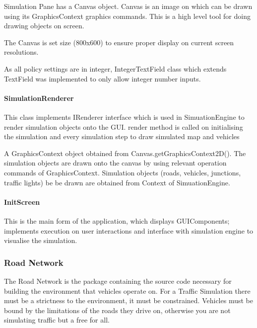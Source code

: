 \documentclass[11pt]{article}
\begin{document}
{\begin{itemize}
    Simulation Pane has a Canvas object. Canvas is an image  on which can be drawn using its GraphicsContext graphics commands. This is a high level tool for doing drawing objects on screen. 
        
    The Canvas is set size (800x600) to ensure proper display on current screen resolutions. 
    
    
    
    As all policy settings are in integer, IntegerTextField  class which extends TextField was implemented to only allow integer number inputs.
    
    
    
    \paragraph{SimulationRenderer}
    
    This class implements IRenderer interface which is used in SimuationEngine to render simulation objects onto the GUI. render method is called on initialising the simulation and every simulation step to draw simulated map and vehicles
    
    A GraphicsContext object obtained from  Canvas.getGraphicsContext2D(). The simulation objects are drawn onto the canvas by using relevant operation commands of GraphicsContext.
    Simulation objects (roads, vehicles, junctions, traffic lights) be be drawn are obtained from Context of SimuationEngine. 
    
    \paragraph{InitScreen}
    This is the main form of the application, which displays GUIComponents; implements execution on user interactions and  interface with simulation engine to visualise the simulation. 
    
    
\pagebreak
\subsubsection{Road Network}

The Road Network is the package containing the source code necessary for building the environment that vehicles operate on. For a Traffic Simulation there must be a strictness to the environment, it must be constrained. Vehicles must be bound by the limitations of the roads they drive on, otherwise you are not simulating traffic but a free for all.


\end{itemize}}
\end{document}
